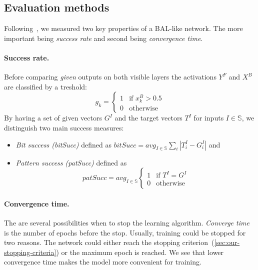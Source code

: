 
\subsection{Evaluation methods} 
\label{sec:sim-evaluation} 

Following~\citet{farkas2013bal}, we measured two key properties of a BAL-like network. The more important being \emph{success rate} and second being \emph{convergence time}. 

\paragraph{Success rate.}  
Before comparing \emph{given} outputs on both visible layers the activations $Y^F$ and $X^B$ are classified by a treshold: 
\begin{equation} 
  g_k =
  \left\{
	  \begin{array}{ll}
		  1 & \mbox{if } x_k^B > 0.5 \\
		  0 & \mbox{otherwise}
	  \end{array}
  \right.  
\end{equation} 
By having a set of given vectors $G^I$ and the target vectors $T^I$ for inputs $I \in \mathbb{S}$, we distinguish two main success measures: 

\begin{itemize}
  \item \emph{Bit success (bitSucc)} defined as $bitSucc = avg_{I \in \mathbb{S}} \sum_i |T_i^I - G^I_i|$ and 
  \item \emph{Pattern success (patSucc)} defined as 
    \begin{equation}
      patSucc = avg_{I \in \mathbb{S}} \left\{
	      \begin{array}{ll}
		      1 & \mbox{if } T^I = G^I \\
		      0 & \mbox{otherwise}
	      \end{array}
      \right.
    \end{equation} 
\end{itemize} 

\paragraph{Convergence time.} The are several possibilities when to stop the learning algorithm. \emph{Converge time} is the number of epochs before the stop. Usually, training could be stopped for two reasons. The network could either reach the stopping criterion~(\ref{sec:our-stopping-criteria}) or the maximum epoch is reached. We see that lower convergence time makes the model more convenient for training.  
